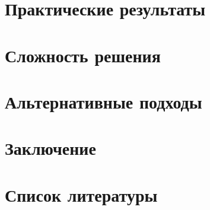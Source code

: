 \documentclass[12pt, a4paper]{article}
\begin{document}
\newpage
\section*{Практические результаты}


\newpage
\section*{Сложность решения}

\newpage
\section*{Альтернативные подходы}

\newpage
\section*{Заключение}

\newpage
\section*{Список литературы}
\end{document}
